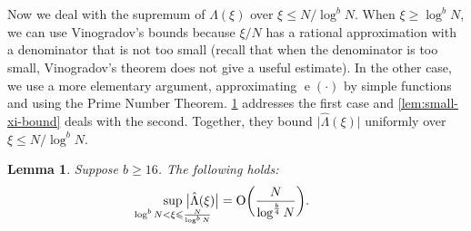 \documentclass[letterpaper, 12pt]{article}
\theoremstyle{plain}
\newtheorem{Lemma}[Theorem]{Lemma}
\theoremstyle{definition}
\theoremstyle{plain}
\theoremstyle{plain}
\numberwithin{equation}{section}
\newcommand{\Oh}{{\rm O}}
\renewcommand{\leq}{\leqslant}
\renewcommand{\geq}{\geqslant}
\newcommand{\1}{\textbf{1}}
\DeclareMathOperator{\e}{e}
\begin{document}
Now we deal with the supremum of $\hat{\Lambda}(\xi)$ over $\xi \leq N/\log^b N$. When $\xi \geq \log^b N$, we can use Vinogradov's bounds because $\xi/N$ has a rational approximation with a denominator that is not too small (recall that when the denominator is too small, Vinogradov's theorem does not give a useful estimate). In the other case, we use a more elementary argument, approximating $\e(\cdot)$ by simple functions and using the Prime Number Theorem. \cref{lem:rational-approx-bound} addresses the first case and \cref{lem:small-xi-bound} deals with the second. Together, they bound $\bigl\lvert \hat{\Lambda}(\xi) \bigr\rvert$ uniformly over $\xi \leq N/\log^b N$.

\begin{Lemma}\label{lem:rational-approx-bound}
    Suppose $b\geq 16$. The following holds:
    \[
        \sup_{\mathclap{\log^b N < \xi \leq \frac{N}{\log^b N}}}\; \bigl\lvert \hat{\Lambda}(\xi) \bigr\rvert
        = \Oh\biggl(\frac{N}{\log^{\frac{b}{4}} N} \biggr).
    \]
\end{Lemma}
\end{document}
